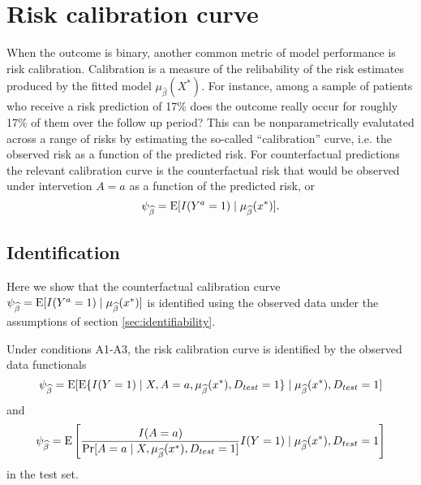 \section{Risk calibration curve}\label{sec:calib}
When the outcome is binary, another common metric of model performance is risk calibration. Calibration is a measure of the relibability of the risk estimates produced by the fitted model $\mu_{\widehat{\beta}}(X^*)$. For instance, among a sample of patients who receive a risk prediction of 17\% does the outcome really occur for roughly 17\% of them over the follow up period? This can be nonparametrically evalutated across a range of risks by estimating the so-called ``calibration'' curve, i.e. the observed risk as a function of the predicted risk. For counterfactual predictions the relevant calibration curve is the counterfactual risk that would be observed under intervetion $A=a$ as a function of the predicted risk, or
\begin{equation}\label{eqn:calib_estimand}
    \psi_{\widehat{\beta}} = \operatorname{E}[I(Y^a = 1) \mid \mu_{\widehat{\beta}}(x^*)].
\end{equation}

\subsection{Identification}
Here we show that the counterfactual calibration curve $\psi_{\widehat{\beta}} = \operatorname{E}[I(Y^a = 1) \mid \mu_{\widehat{\beta}}(x^*)]$ is identified using the observed data under the assumptions of section \ref{sec:identifiability}.
\begin{theorem}
     Under conditions A1-A3, the risk calibration curve is identified by the observed data functionals
\begin{equation}\label{eqn:cl_calib_estimand}
    \psi_{\widehat{\beta}} = \operatorname{E}[\operatorname{E}\{I(Y = 1) \mid X, A = a, \mu_{\widehat{\beta}}(x^*), D_{test} = 1\}\mid \mu_{\widehat{\beta}}(x^*), D_{test} = 1]
\end{equation}
and 
\begin{equation}\label{eqn:ipw_calib_estimand}
    \psi_{\widehat{\beta}} = \operatorname{E}\left[\frac{I(A = a)}{\Pr[A = a \mid X, \mu_{\widehat{\beta}}(x^*), D_{test} = 1]} I(Y=1) \mid \mu_{\widehat{\beta}}(x^*), D_{test} = 1\right]
\end{equation}
in the test set. 

\end{theorem}

